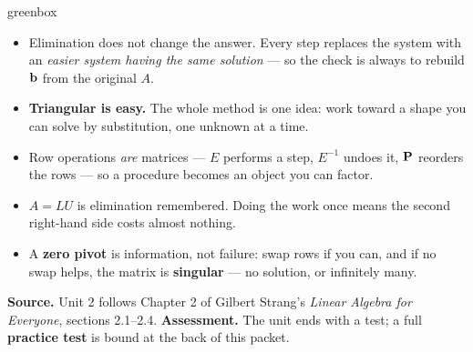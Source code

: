 \begin{skillbox}{greenbox}
\small
\begin{itemize}[leftmargin=1.3em, itemsep=3pt, topsep=1pt]
  \item Elimination does not change the answer. Every step replaces the system with an
        \emph{easier system having the same solution} --- so the check is always to rebuild
        $\mathbf{b}$ from the original $A$.
  \item \textbf{Triangular is easy.} The whole method is one idea: work toward a shape you can
        solve by substitution, one unknown at a time.
  \item Row operations \emph{are} matrices --- $E$ performs a step, $E^{-1}$ undoes it, $\mathbf{P}$
        reorders the rows --- so a procedure becomes an object you can factor.
  \item $A = LU$ is elimination remembered. Doing the work once means the second right-hand
        side costs almost nothing.
  \item A \textbf{zero pivot} is information, not failure: swap rows if you can, and if no swap
        helps, the matrix is \textbf{singular} --- no solution, or infinitely many.
\end{itemize}
\end{skillbox}

\vspace{0.10in}

\begin{remindbox}
\small
\textbf{Source.} Unit 2 follows Chapter 2 of Gilbert Strang's \emph{Linear Algebra for
Everyone}, sections 2.1--2.4.\quad
\textbf{Assessment.} The unit ends with a test; a full \textbf{practice test} is bound at the
back of this packet.
\end{remindbox}
